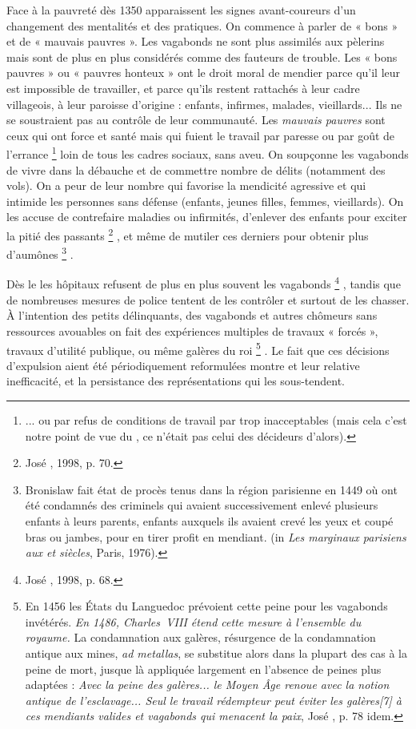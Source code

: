  Face à la pauvreté dès 1350 apparaissent les signes avant-coureurs d'un changement des mentalités et des pratiques. On commence à parler de « {bons} » et de « {mauvais pauvres} ». Les vagabonds ne sont plus assimilés aux pèlerins mais sont de plus en plus considérés comme des fauteurs de trouble. Les « {bons pauvres} » ou « {pauvres honteux} » ont le droit moral de mendier parce qu'il leur est impossible de travailler, et parce qu'ils restent rattachés à leur cadre villageois, à leur paroisse d'origine : enfants, infirmes, malades, vieillards... Ils ne se soustraient pas au contrôle de leur communauté. Les \emph{mauvais pauvres} sont ceux qui ont force et santé mais qui fuient le travail par paresse ou par goût de l'errance%
\footnote{... ou par refus de conditions de travail par trop inacceptables (mais cela c'est notre point de vue du , ce n'était pas celui des décideurs d'alors).} 
loin de tous les cadres sociaux, sans aveu. On soupçonne les vagabonds de vivre dans la débauche et de commettre nombre de délits (notamment des vols). On a peur de leur nombre qui favorise la mendicité agressive et qui intimide les personnes sans défense (enfants, jeunes filles, femmes, vieillards). On les accuse de contrefaire maladies ou infirmités, d'enlever des enfants pour exciter la pitié des passants%
\footnote{José , 1998, p. 70.}%
, et même de mutiler ces derniers pour obtenir plus d'aumônes%
\footnote{Bronislaw  fait état de procès tenus dans la région parisienne en 1449 où ont été condamnés des criminels qui avaient successivement enlevé plusieurs enfants à leurs parents, enfants auxquels ils avaient crevé les yeux et coupé bras ou jambes, pour en tirer profit en mendiant. (in \emph{Les marginaux parisiens aux  et  siècles}, Paris, 1976).}%
. 

 Dès le  les hôpitaux refusent de plus en plus souvent les vagabonds%
\footnote{José , 1998, p. 68.}%
, tandis que de nombreuses mesures de police tentent de les contrôler et surtout de les chasser. À l'intention des petits délinquants, des vagabonds et autres chômeurs sans ressources avouables on fait des expériences multiples de travaux « forcés », travaux d'utilité publique, ou même galères du roi%
\footnote{En 1456 les États du Languedoc prévoient cette peine pour les vagabonds invétérés. \emph{En 1486, Charles~VIII étend cette mesure à l'ensemble du royaume.} La condamnation aux galères, résurgence de la condamnation antique aux mines, \emph{ad metallas}, se substitue alors dans la plupart des cas à la peine de mort, jusque là appliquée largement en l'absence de peines plus adaptées : \emph{Avec la peine des galères... le Moyen Âge renoue avec la notion antique de l'esclavage... Seul le travail rédempteur peut éviter les galères[7] à ces mendiants valides et vagabonds qui menacent la paix}, José , p. 78 idem.}%
. Le fait que ces décisions d'expulsion aient été périodiquement reformulées montre et leur relative inefficacité, et la persistance des représentations qui les sous-tendent.

